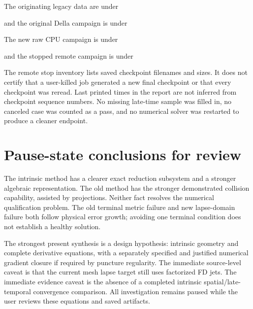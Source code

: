 \documentclass[11pt,letterpaper]{article}
\begin{document}
The originating legacy data are under
\begin{quote}\small{}\end{quote}
and the original Della campaign is under
\begin{quote}\small{}\end{quote}
The new raw CPU campaign is under
\begin{quote}\small{}\end{quote}
and the stopped remote campaign is under
\begin{quote}\small{}\end{quote}
The remote stop inventory lists saved checkpoint filenames and sizes. It does not certify that a user-killed job generated a new final checkpoint or that every checkpoint was reread. Last printed times in the report are not inferred from checkpoint sequence numbers. No missing late-time sample was filled in, no canceled case was counted as a pass, and no numerical solver was restarted to produce a cleaner endpoint.

\section{Pause-state conclusions for review}
The intrinsic method has a clearer exact reduction subsystem and a stronger algebraic representation. The old method has the stronger demonstrated collision capability, assisted by projections. Neither fact resolves the numerical qualification problem. The old terminal metric failure and new lapse-domain failure both follow physical error growth; avoiding one terminal condition does not establish a healthy solution.

The strongest present synthesis is a design hypothesis: intrinsic geometry and complete derivative equations, with a separately specified and justified numerical gradient closure if required by puncture regularity. The immediate source-level caveat is that the current mesh lapse target still uses factorized FD jets. The immediate evidence caveat is the absence of a completed intrinsic spatial/late-temporal convergence comparison. All investigation remains paused while the user reviews these equations and saved artifacts.
\end{document}
